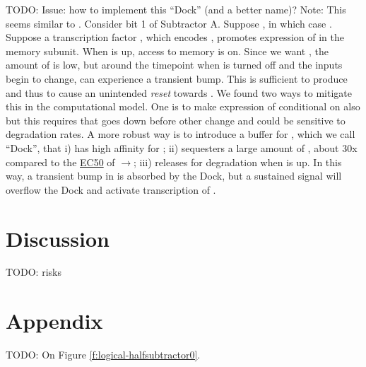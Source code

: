 \documentclass[12pt,notitlepage]{article}
\newcommand{\TODO}[1]{\textrm{\color{red}TODO: #1}}
\newcommand{\act}{\ensuremath{\to}\xspace}
\newcommand{\ra}[1]{{\color{Blue}#1}}
\begin{document}
\TODO{\ra{Issue: how to implement this ``Dock'' (and a better name)?}}
\ra{%
Note: This seems similar to
\cite[\href{{https://www.pnas.org/content/pnas/104/8/2643/F1.large.jpg?width=800&height=600&carousel=1}}{Fig.~1}]{WeberETAL2007}.
}
%
Consider bit 1 of Subtractor A.
%
Suppose ,
in which case .
%
Suppose a transcription factor ,
which encodes ,
promotes expression of  in the memory subunit.
%
%
When  is up,
access to memory is on.
%
Since we want ,
the amount of  is low,
but
around the timepoint when 
 is turned off
and the inputs begin to change,
 can experience a transient bump.
%
This is sufficient to produce 
and thus to cause an unintended \emph{reset}
towards .
%
We found two ways to mitigate this
in the computational model.
%
One is to make expression of 
conditional on  also
but this requires that  goes down
before other change
and could be sensitive to degradation rates.
%
A more robust way
is to introduce a buffer for ,
which we call ``Dock'',
that 
%
i)
has high affinity for ;
%
ii)
sequesters a large amount of ,
about 30x compared to the 
\href{https://en.wikipedia.org/wiki/EC50}{EC50}
of  \act {};
%
iii)
releases  for degradation when  is up.
%
In this way, 
a transient bump in  is absorbed 
by the Dock,
but a sustained signal 
will overflow the Dock and activate 
transcription of .
%


%

\section{Discussion}

\TODO{risks}


\footnotesize




\section*{Appendix}

\TODO{On Figure \ref{f:logical-halfsubtractor0}.}
\end{document}
